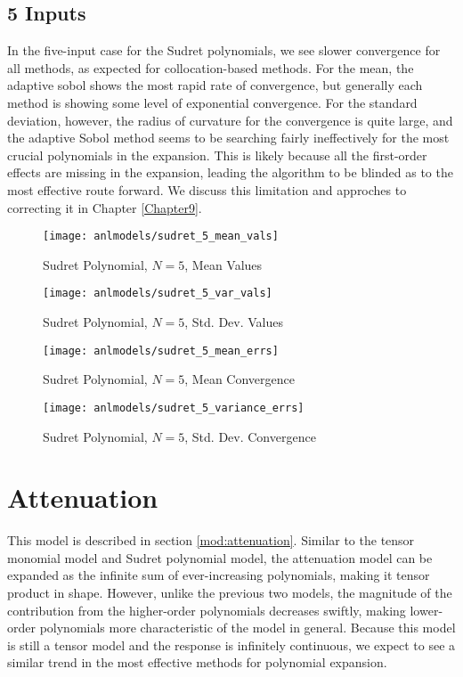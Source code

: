 \subsection{5 Inputs}
In the five-input case for the Sudret polynomials, we see slower convergence for all methods, as expected
for collocation-based methods.  For the mean, the adaptive sobol shows the most rapid rate of convergence,
but generally each method is showing some level of exponential convergence.  For the standard deviation,
however, the radius of curvature for the convergence is quite large, and the adaptive Sobol method seems
to be searching fairly ineffectively for the most crucial polynomials in the expansion.  This is likely
because all the first-order effects are missing in the expansion, leading the algorithm to be blinded as
to the most effective route forward.  We discuss this limitation and approches to correcting it in 
Chapter \ref{Chapter9}.
\begin{figure}[H]
  \centering
  \texttt{[image: anlmodels/sudret\_5\_mean\_vals]}
  \caption{Sudret Polynomial, $N=5$, Mean Values}
  \label{fig:sudretpoly mean values 5}
\end{figure}
\begin{figure}[H]
  \centering
  \texttt{[image: anlmodels/sudret\_5\_var\_vals]}
  \caption{Sudret Polynomial, $N=5$, Std. Dev. Values}
  \label{fig:sudretpoly var values 5}
\end{figure}

\begin{figure}[H]
  \centering
  \texttt{[image: anlmodels/sudret\_5\_mean\_errs]}
  \caption{Sudret Polynomial, $N=5$, Mean Convergence}
  \label{fig:sudretpoly mean errors 5}
\end{figure}
\begin{figure}[H]
  \centering
  \texttt{[image: anlmodels/sudret\_5\_variance\_errs]}
  \caption{Sudret Polynomial, $N=5$, Std. Dev. Convergence}
  \label{fig:sudretpoly var errors 5}
\end{figure}


\section{Attenuation}
This model is described in section \ref{mod:attenuation}.  Similar to the tensor monomial model and Sudret
polynomial model, the attenuation model can be expanded as the infinite sum of ever-increasing polynomials,
making it tensor product in shape.  However, unlike the previous two models, the magnitude of the contribution
from the higher-order polynomials decreases swiftly, making lower-order polynomials more characteristic of the
model in general.  Because this model is still a tensor model and the response is infinitely continuous,
we expect to see a similar trend in the most effective methods for polynomial expansion.

